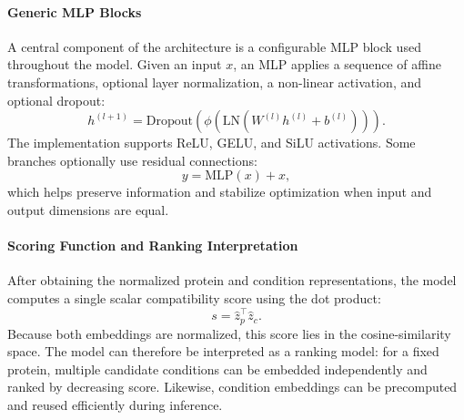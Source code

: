 \paragraph{Generic MLP Blocks}

A central component of the architecture is a configurable MLP block used throughout the model. Given an input $x$, an MLP applies a sequence of affine transformations, optional layer normalization, a non-linear activation, and optional dropout:
\begin{equation}
    h^{(l+1)} = \mathrm{Dropout}\!\left(\phi\!\left(\mathrm{LN}(W^{(l)} h^{(l)} + b^{(l)})\right)\right).
\end{equation}
The implementation supports ReLU, GELU, and SiLU activations. Some branches optionally use residual connections:
\begin{equation}
    y = \mathrm{MLP}(x) + x,
\end{equation}
which helps preserve information and stabilize optimization when input and output dimensions are equal.

\paragraph{Scoring Function and Ranking Interpretation}

After obtaining the normalized protein and condition representations, the model computes a single scalar compatibility score using the dot product:
\begin{equation}
    s = \hat{z}_p^\top \hat{z}_c.
\end{equation}
Because both embeddings are normalized, this score lies in the cosine-similarity space. The model can therefore be interpreted as a ranking model: for a fixed protein, multiple candidate conditions can be embedded independently and ranked by decreasing score. Likewise, condition embeddings can be precomputed and reused efficiently during inference.
